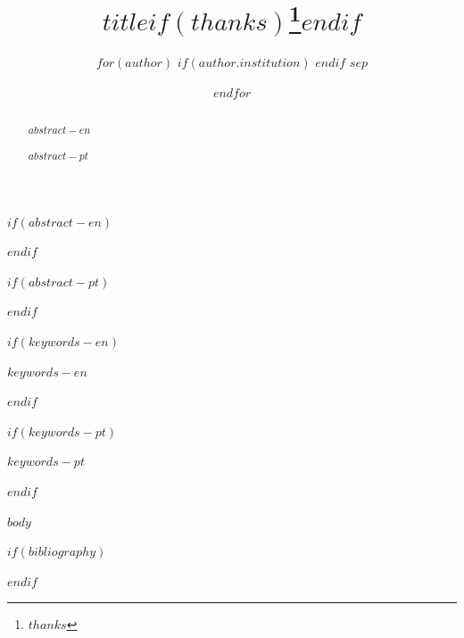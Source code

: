 \documentclass[conference]{IEEEtran}
\begin{document}
\title{$title$$if(thanks)$\thanks{$thanks$}$endif$}

\author{
$for(author)$
  $if(author.institution)$
  $endif$
  $sep$\and
$endfor$
}

\maketitle

$if(abstract-en)$
\begin{abstract}
$abstract-en$
\end{abstract}
$endif$

$if(abstract-pt)$
\begin{abstract}
$abstract-pt$
\end{abstract}
$endif$

$if(keywords-en)$
\begin{IEEEkeywords}
$keywords-en$
\end{IEEEkeywords}
$endif$

$if(keywords-pt)$
\begin{IEEEkeywords}
$keywords-pt$
\end{IEEEkeywords}
$endif$

$body$

$if(bibliography)$


$endif$
\end{document}
